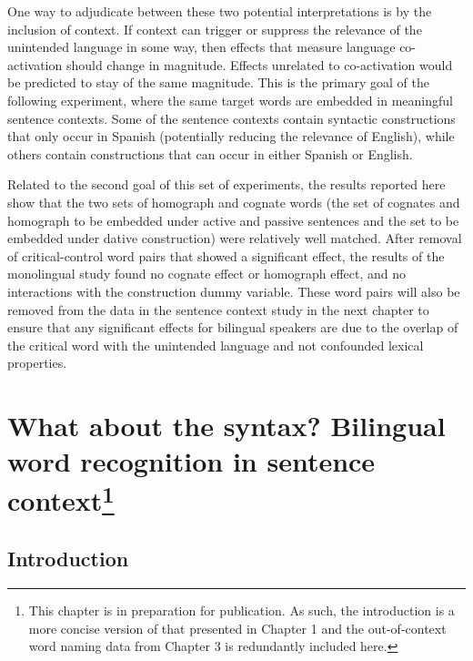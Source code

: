 One way to adjudicate between these two potential interpretations is by the inclusion of context. If context can trigger or suppress the relevance of the unintended language in some way, then effects that measure language co-activation should change in magnitude. Effects unrelated to co-activation would be predicted to stay of the same magnitude. This is the primary goal of the following experiment, where the same target words are embedded in meaningful sentence contexts. Some of the sentence contexts contain syntactic constructions that only occur in Spanish (potentially reducing the relevance of English), while others contain constructions that can occur in either Spanish or English. 

Related to the second goal of this set of experiments, the results reported here show that the two sets of homograph and cognate words (the set of cognates and homograph to be embedded under active and passive sentences and the set to be embedded under dative construction) were relatively well matched. After removal of critical-control word pairs that showed a significant effect, the results of the monolingual study found no cognate effect or homograph effect, and no interactions with the construction dummy variable. These word pairs will also be removed from the data in the sentence context study in the next chapter to ensure that any significant effects for bilingual speakers are due to the overlap of the critical word with the unintended language and not confounded lexical properties. 



\chapter[What about the syntax? Bilingual word recognition in sentence context]{What about the syntax? Bilingual word recognition in sentence context\footnote{This chapter is in preparation for publication. As
    such, the introduction is a more concise version of that presented
    in Chapter 1 and the out-of-context word naming data from Chapter
    3 is redundantly included here.}}
\label{whataboutthesyntaxbilingualwordrecognitioninsentencecontext}

\section{Introduction}
\label{introduction}

